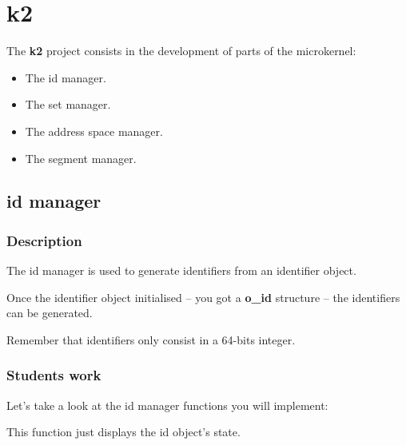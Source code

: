 
%
%

\section{k2}

The \textbf{k2} project consists in the development of parts of
the microkernel:

\begin{itemize}
  \item
    The id manager.
  \item
    The set manager.
  \item
    The address space manager.
  \item
    The segment manager.
\end{itemize}

%
%

\subsection{id manager}

\subsubsection{Description}

The id manager is used to generate identifiers from an identifier object.

Once  the identifier object  initialised --  you got  a \textbf{o\_id}
structure -- the identifiers can be generated.

Remember that identifiers only consist in a 64-bits integer.

\subsubsection{Students work}

Let's take a look at the id manager functions you will implement:


This function just displays the id object's state.


